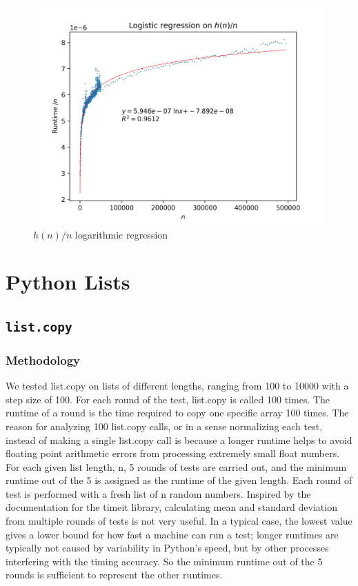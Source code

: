 \documentclass[titlepage, 12pt]{article}
\begin{document}
\begin{figure}[H]
  \includegraphics[width=0.8\linewidth]{hn-over-n-logreg.png}
  \centering
  \caption{$h(n)/n$ logarithmic regression}
  \label{fig:hn-over-n-logreg}
\end{figure}

\section{Python Lists}

\subsection{\texttt{list.copy}}

\subsubsection{Methodology}

We tested list.copy on lists of different lengths, ranging from 100 to 10000
with a step size of 100. For each round of the test, list.copy is called 100
times. The runtime of a round is the time required to copy one specific array
100 times. The reason for analyzing 100 list.copy calls, or in a sense
normalizing each test, instead of making a single list.copy call is because a
longer runtime helps to avoid floating point arithmetic errors from processing
extremely small float numbers. For each given list length, n, 5 rounds of tests
are carried out, and the minimum runtime out of the 5 is assigned as the runtime
of the given length. Each round of test is performed with a fresh list of n
random numbers. Inspired by the documentation for the timeit library,
calculating mean and standard deviation from multiple rounds of tests is not
very useful. In a typical case, the lowest value gives a lower bound for how
fast a machine can run a test; longer runtimes are typically not caused by
variability in Python’s speed, but by other processes interfering with the
timing accuracy. So the minimum runtime out of the 5 rounds is sufficient to
represent the other runtimes.
\end{document}
